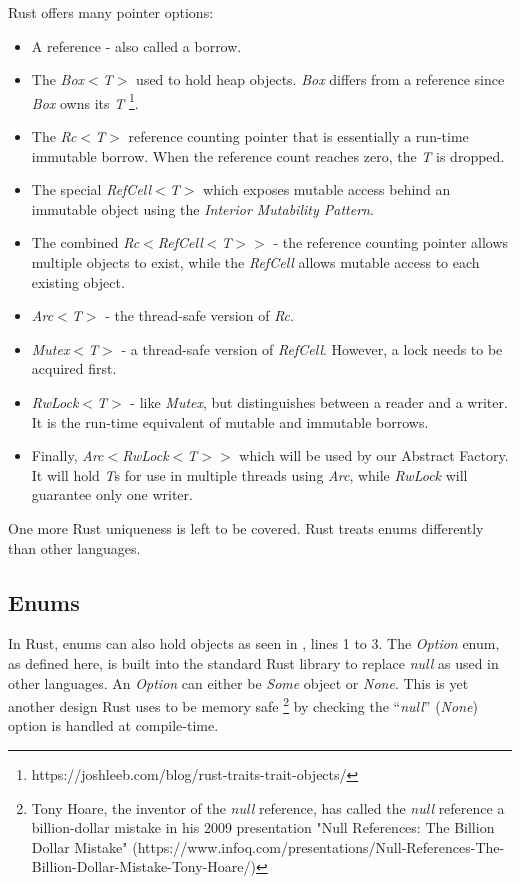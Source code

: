 Rust offers many pointer options: \cite{klabnik_2019_01}
\begin{itemize}
	\item A reference - also called a borrow.
	\item The \textit{Box$<$T$>$} used to hold heap objects.
	      \textit{Box} differs from a reference since \textit{Box} owns its \textit{T} \footnote{https://joshleeb.com/blog/rust-traits-trait-objects/}.
	\item The \textit{Rc$<$T$>$} reference counting pointer that is essentially a run-time immutable borrow.
	      When the reference count reaches zero, the \textit{T} is dropped.
	\item The special \textit{RefCell$<$T$>$} which exposes mutable access behind an immutable object using the \textit{Interior Mutability Pattern}.
	\item The combined \textit{Rc$<$RefCell$<$T$>$$>$} - the reference counting pointer allows multiple objects to exist, while the \textit{RefCell} allows mutable access to each existing object.
	\item \textit{Arc$<$T$>$} - the thread-safe version of \textit{Rc}.
	\item \textit{Mutex$<$T$>$} - a thread-safe version of \textit{RefCell}.
	      However, a lock needs to be acquired first.
	\item \textit{RwLock$<$T$>$} - like \textit{Mutex}, but distinguishes between a reader and a writer.
	      It is the run-time equivalent of mutable and immutable borrows.
	\item Finally, \textit{Arc$<$RwLock$<$T$>$$>$} which will be used by our Abstract Factory.
	      It will hold \textit{T}s for use in multiple threads using \textit{Arc}, while \textit{RwLock} will guarantee only one writer.
\end{itemize}

One more Rust uniqueness is left to be covered. Rust treats enums differently than other languages.

\subsection{Enums}
In Rust, enums can also hold objects \cite{klabnik_2019_01} as seen in , lines 1 to 3.
The \textit{Option} enum, as defined here, is built into the standard Rust library \cite{klabnik_2019_01} to replace \textit{null} as used in other languages.
An \textit{Option} can either be \textit{Some} object or \textit{None}.
This is yet another design Rust uses to be memory safe \footnote{Tony Hoare, the inventor of the \textit{null} reference, has called the \textit{null} reference a billion-dollar mistake in his 2009 presentation "Null References: The Billion Dollar Mistake" (https://www.infoq.com/presentations/Null-References-The-Billion-Dollar-Mistake-Tony-Hoare/)} by checking the ``\textit{null}'' (\textit{None}) option is handled at compile-time.

